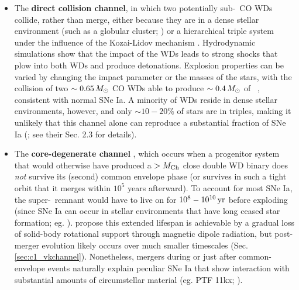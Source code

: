 \begin{itemize}
	\item The {\bf direct collision channel}, in which two potentially sub-\Mch\ CO WDs collide, rather than merge, either because they are in a dense stellar environment (such as a globular cluster; \citealt{benzth89, loreig10}) or a hierarchical triple system \citep{katzd12} under the influence of the Kozai-Lidov mechanism \citep{koza62, lido62}.  Hydrodynamic simulations \citep{rask+10, kush+13, garc+13} show that the impact of the WDs leads to strong shocks that plow into both WDs and produce detonations.  Explosion properties can be varied by changing the impact parameter or the masses of the stars, with the collision of two $\sim0.65\,\Msun$ CO WDs able to produce $\sim0.4\,\Msun$ of \Ni\ \citep{garc+13, kush+13}, consistent with normal SNe Ia.  A minority of WDs reside in dense stellar environments, however, and only $\sim10-20$\% of stars are in triples, making it unlikely that this channel alone can reproduce a substantial fraction of SNe Ia (\citealt{maozmn14}; see their Sec. 2.3 for details).

	\item The {\bf core-degenerate channel} \citep{livir03, kashs11, tsebs15}, which occurs when a progenitor system that would otherwise have produced a $>\Mch$ close double WD binary does \textit{not} survive its (second) common envelope phase (or survives in such a tight orbit that it merges within $10^5$ years afterward).  To account for most SNe Ia, the super-\Mch\ remnant would have to live on for $10^{8}-10^{10}\,\mathrm{yr}$ before exploding (since SNe Ia can occur in stellar environments that have long ceased star formation; eg. \citealt{prichs08, maozsg10}).  \cite{illks12} propose this extended lifespan is achievable by a gradual loss of solid-body rotational support through magnetic dipole radiation, but post-merger evolution likely occurs over much smaller timescales (Sec. \ref{sec:c1_vkchannel}).  Nonetheless, mergers during or just after common-envelope events naturally explain peculiar SNe Ia that show interaction with substantial amounts of circumstellar material (eg. PTF 11kx; \citealt{dild+12, soke13}).

\end{itemize}


